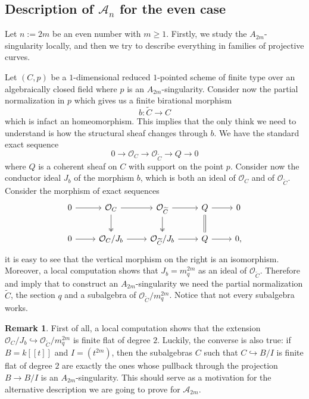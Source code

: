 \documentclass{alggeom}
\numberwithin{equation}{section}
\numberwithin{subsection}{section}
\theoremstyle{definition}
\newtheorem{remark}[theorem]{Remark}
\theoremstyle{remark}
\newcommand\cA{\mathcal{A}} \newcommand\cB{\mathcal{B}}
\newcommand\cO{\mathcal{O}} \newcommand\cP{\mathcal{P}}
\newcommand\into{\hookrightarrow}
\begin{document}
\subsection*{Description of $\cA_n$ for the even case}

Let $n:=2m$ be an even number with $m\geq 1$. Firstly, we study the $A_{2m}$-singularity locally, and then we try to describe everything in families of projective curves.

Let $(C,p)$ be a $1$-dimensional reduced $1$-pointed scheme of finite type over an algebraically closed field where $p$ is an $A_{2m}$-singularity. Consider now the partial normalization in $p$ which gives us a finite birational morphism 
$$b:\widetilde{C} \longrightarrow C$$ 
which is infact an homeomorphism. This implies that the only think we need to understand is how the structural sheaf changes through $b$. We have the standard exact sequence
$$ 0 \rightarrow \cO_C \rightarrow \cO_{\widetilde{C}} \rightarrow Q \rightarrow 0$$
where $Q$ is a coherent sheaf on $C$ with support on the point $p$. Consider now the conductor ideal $J_b$ of the morphism $b$, which is both an ideal of $\cO_C$ and of $\cO_{\widetilde{C}}$.  Consider the morphism of exact sequences
$$
\begin{tikzcd}
	0 \arrow[r] & \cO_C \arrow[r] \arrow[d, two heads] & \cO_{\widetilde{C}} \arrow[r] \arrow[d, two heads] & Q \arrow[r] \arrow[d, Rightarrow, no head] & 0 \\
	0 \arrow[r] & \cO_C/J_b \arrow[r]                    & \cO_{\widetilde{C}}/J_b \arrow[r]                    & Q \arrow[r]                                & 0,
\end{tikzcd}
$$
it is easy to see that the vertical morphism on the right is an isomorphism. Moreover, a local computation shows that $J_b=m_q^{2m}$ as an ideal of $\cO_{\widetilde{C}}$. Therefore  and  imply that to construct an $A_{2m}$-singularity we need the partial normalization $\widetilde{C}$, the section $q$ and a subalgebra of $\cO_{\widetilde{C}}/m_q^{2m}$. Notice that not every subalgebra works. 

\begin{remark}
	First of all, a local computation shows that the extension $\cO_{C}/J_b \into \cO_{\widetilde{C}}/m_q^{2m}$ is finite flat of degree $2$. Luckily, the converse is also true: if $B=k[[t]]$ and $I=(t^{2m})$, then the subalgebras $C$ such that $C \into B/I$ is finite flat of degree $2$ are exactly the ones whose pullback through the projection $B \rightarrow B/I$ is an $A_{2m}$-singularity. This should serve as a motivation for the alternative description we are going to prove for $\cA_{2m}$.
\end{remark}  
\end{document}
